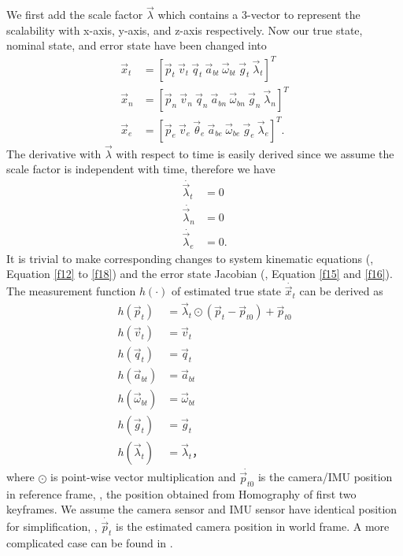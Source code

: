 We first add the scale factor $\vec{\lambda}$ which contains a 3-vector to represent the scalability with x-axis, y-axis, and z-axis respectively. Now our true state, nominal state, and error state have been changed into
\begin{align}
	\vec{x}_t &= \left[ \vec{p}_t \ \vec{v}_t \ \vec{q}_t \ \vec{a}_{bt} \ \vec{\omega}_{bt} \ \vec{g}_{t} \ \vec{\lambda}_{t} \right]^T \\
	\vec{x}_n &= \left[ \vec{p}_n \ \vec{v}_n \ \vec{q}_n \ \vec{a}_{bn} \ \vec{\omega}_{bn} \ \vec{g}_{n} \ \vec{\lambda}_{n} \right]^T \\
	\vec{x}_e &= \left[ \vec{p}_e \ \vec{v}_e \ \vec{\theta}_e \ \vec{a}_{be} \ \vec{\omega}_{be} \ \vec{g}_{e} \ \vec{\lambda}_{e} \right]^T .
\end{align}
The derivative with $\vec{\lambda}$ with respect to time is easily derived since we assume the scale factor is independent with time, therefore we have
\begin{align}
	\dot{\vec{\lambda}_t} &= 0 \\
	\dot{\vec{\lambda}_n} &= 0 \\
	\dot{\vec{\lambda}_e} &= 0.
\end{align}
It is trivial to make corresponding changes to system kinematic equations (\eg, Equation \ref{f12} to \ref{f18}) and the error state Jacobian (\eg, Equation \ref{f15} and \ref{f16}). The measurement function $h(\cdot)$ of estimated true state $\dot{\vec{x}_t}$ can be derived as
\begin{align}
	\label{f23}
	h(\vec{p}_t) &= \vec{\lambda}_t \odot (\vec{p}_t - \vec{p}_{t0}) + \vec{p}_{t0}\\
	\label{f24}
	h(\vec{v}_t) &= \vec{v}_t\\
	\label{f25}
	h(\vec{q}_t) &= \vec{q}_t\\
	\label{f26}
	h(\vec{a}_{bt}) &= \vec{a}_{bt} \\
	\label{f27}
	h(\vec{\omega}_{bt}) &= \vec{\omega}_{bt} \\ 
	\label{f28}
	h(\vec{g}_t) &= \vec{g}_t \\
	\label{f29}
	h(\vec{\lambda}_t) &= \vec{\lambda}_t，
\end{align}
where $\odot$ is point-wise vector multiplication and $\dot{\vec{p}_{t0}}$ is the camera/IMU position in reference frame, \ie, the position obtained from Homography of first two keyframes. We assume the camera sensor and IMU sensor have identical position for simplification, \ie, $\dot{\vec{p}_t}$ is the estimated camera position in world frame. A more complicated case can be found in \cite{lynen2013robust}.


